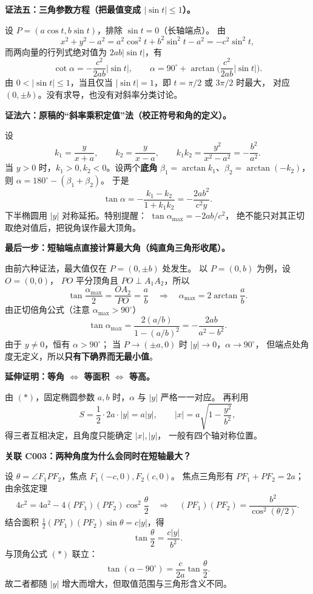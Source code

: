 \begin{proofbox}
\medskip
\textbf{证法五：三角参数方程（把最值变成 $|\sin t|\le1$）。}

设 $P=(a\cos t,b\sin t)$，排除 $\sin t=0$（长轴端点）。
由
\[
x^2+y^2-a^2
=a^2\cos^2t+b^2\sin^2t-a^2
=-c^2\sin^2t,
\]
而两向量的行列式绝对值为 $2ab|\sin t|$，有
\[
\cot\alpha=-\frac{c^2}{2ab}|\sin t|,
\qquad
\alpha=90^\circ+\arctan\biggl(\frac{c^2}{2ab}|\sin t|\biggr).
\]
由 $0<|\sin t|\le1$，当且仅当
$|\sin t|=1$，即 $t=\pi/2$ 或 $3\pi/2$ 时最大，
对应 $(0,\pm b)$。没有求导，也没有对斜率分类讨论。

\medskip
\textbf{证法六：原稿的“斜率乘积定值”法（校正符号和角的定义）。}

设
\[
k_1=\frac{y}{x+a},\qquad k_2=\frac{y}{x-a},
\qquad k_1k_2=\frac{y^2}{x^2-a^2}=-\frac{b^2}{a^2}.
\]
当 $y>0$ 时，$k_1>0,k_2<0$。设两个\textbf{底角}
$\beta_1=\arctan k_1$、$\beta_2=\arctan(-k_2)$，则
$\alpha=180^\circ-(\beta_1+\beta_2)$。
于是
\[
\tan\alpha=-\frac{k_1-k_2}{1+k_1k_2}
=-\frac{2ab^2}{c^2y}.
\]
下半椭圆用 $|y|$ 对称延拓。特别提醒：
$\tan\alpha_{\max}=-2ab/c^2$，
绝不能只对其正切取绝对值后，把锐角误作最大顶角。

\medskip
\textbf{最后一步：短轴端点直接计算最大角（纯直角三角形收尾）。}

由前六种证法，最大值仅在 $P=(0,\pm b)$ 处发生。
以 $P=(0,b)$ 为例，设 $O=(0,0)$，
$PO$ 平分顶角且 $PO\perp A_1A_2$，所以
\[
\tan\frac{\alpha_{\max}}2=\frac{OA_2}{PO}=\frac ab
\quad\Longrightarrow\quad
\boxed{\alpha_{\max}=2\arctan\frac ab}.
\]
由正切倍角公式（注意 $\alpha_{\max}>90^\circ$）
\[
\tan\alpha_{\max}
=\frac{2(a/b)}{1-(a/b)^2}
=\boxed{-\frac{2ab}{a^2-b^2}}.
\]
由于 $y\ne0$，恒有 $\alpha>90^\circ$；
当 $P\to(\pm a,0)$ 时 $|y|\to0$，$\alpha\to90^\circ$，
但端点处角度无定义，所以\textbf{只有下确界而无最小值}。

\medskip
\textbf{延伸证明：等角 $\Longleftrightarrow$ 等面积 $\Longleftrightarrow$ 等高。}

由 $(*)$，固定椭圆参数 $a,b$ 时，$\alpha$ 与 $|y|$ 严格一一对应。
再利用
\[
S=\frac12\cdot 2a\cdot|y|=a|y|,
\qquad |x|=a\sqrt{1-\frac{y^2}{b^2}},
\]
得三者互相决定，且角度只能确定 $|x|,|y|$，
一般有四个轴对称位置。

\medskip
\textbf{关联 C003：两种角度为什么会同时在短轴最大？}

设 $\theta=\angle F_1PF_2$，焦点 $F_1(-c,0),F_2(c,0)$。
焦点三角形有 $PF_1+PF_2=2a$；由余弦定理
\[
4c^2=4a^2-4(PF_1)(PF_2)\cos^2\frac\theta2
\quad\Rightarrow\quad
(PF_1)(PF_2)=\frac{b^2}{\cos^2(\theta/2)}.
\]
结合面积
$\frac12(PF_1)(PF_2)\sin\theta=c|y|$，得
\[
\tan\frac\theta2=\frac{c|y|}{b^2}.
\]
与顶角公式 $(*)$ 联立：
\[
\boxed{\tan(\alpha-90^\circ)=\frac{c}{2a}\tan\frac\theta2}.
\]
故二者都随 $|y|$ 增大而增大，但取值范围与三角形含义不同。
\end{proofbox}
